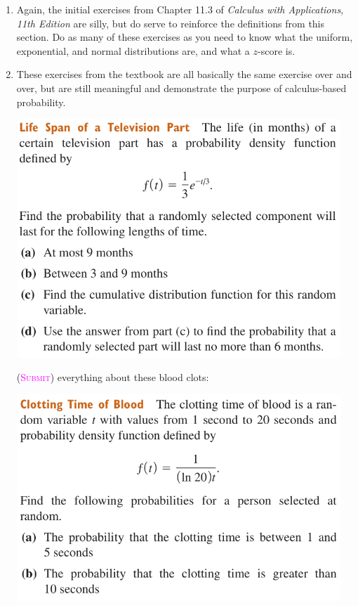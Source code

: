 \begin{enumerate}
    \item %
        Again, the initial exercises from Chapter 11.3 of 
        \emph{Calculus with Applications, 11th Edition}
        are silly, but do serve to reinforce the definitions from this section.
        Do as many of these exercises as you need to
        know what the uniform, exponential, and normal distributions are,
        and what a $z$-score is.

    \item 
        These exercises from the textbook are all basically the same exercise
        over and over, but are still meaningful and demonstrate the purpose 
        of calculus-based probability.
        \begin{center}
            \includegraphics[width=0.96\textwidth]{screenshots/television.png}
        \end{center}
        \newpage
        (\textsc{\textcolor{magenta}{Submit}})
        everything about these blood clots:
        \begin{center}
            \includegraphics[width=0.96\textwidth]{screenshots/blood1.png}

\end{center}
\end{enumerate}
